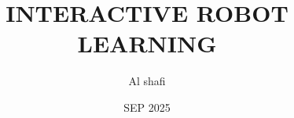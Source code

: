 \documentclass[rnd]{mas_report}
\author{Al shafi}
\title{INTERACTIVE ROBOT LEARNING}
\date{SEP 2025}
\begin{document}
\frontmatter

\begin{titlepage}
    \maketitle
\end{titlepage}



\pagestyle{plain}
\clearpage







\tableofcontents


\mainmatter %

\pagestyle{mainmatter}

% 





\begin{appendices}
    
\end{appendices}

\backmatter

\nocite{*}

\end{document}
